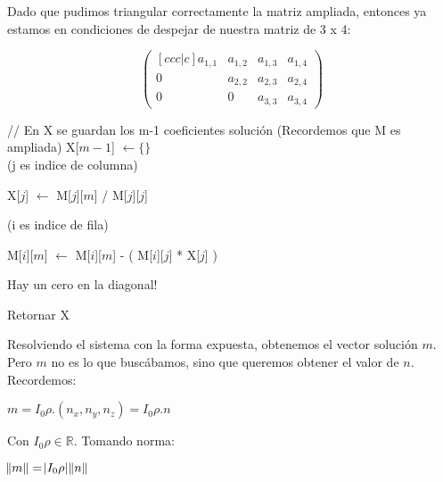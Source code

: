 Dado que pudimos triangular correctamente la matriz ampliada, entonces ya estamos en condiciones de despejar de nuestra matriz de 3 x 4:

\[
\begin{pmatrix}[ccc|c]
    a_{1,1}   & a_{1,2} & a_{1,3} & a_{1, 4} \\
    0         & a_{2,2} & a_{2,3} & a_{2, 4} \\
    0         & 0       & a_{3,3} & a_{3, 4}
\end{pmatrix}
\]

\begin{algorithm}[H]
\begin{algorithmic}


    // En X se guardan los m-1 coeficientes solución (Recordemos que M es ampliada)
    \State X[$m-1$] $\gets \{\}$ \\

      (j es indice de columna)


            \State X[$j$] $\gets$ M[$j$][$m$] / M[$j$][$j$]

              (i es indice de fila)

                \State M[$i$][$m$] $\gets$ M[$i$][$m$] - ( M[$i$][$j$] * X[$j$] )

            \EndFor

        \Else
            \State Hay un cero en la diagonal!
        \EndIf
    \EndFor

    \State Retornar X

\EndFunction
\end{algorithmic}
\end{algorithm}

Resolviendo el sistema con la forma expuesta, obtenemos el vector solución $m$. Pero $m$ no es lo que buscábamos, sino que queremos obtener el valor de $n$. Recordemos:

\begin{center}
$m = I_0 \rho . (n_x, n_y, n_z) = I_0 \rho . n$
\end{center}

Con $I_0 \rho \in \mathbb{R}$. Tomando norma:

\begin{center}
$\norm{m} = \abs{I_0 \rho} \norm{n}$
\end{center}

